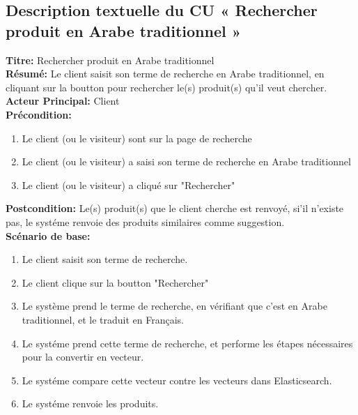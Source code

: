 \subsection{Description textuelle du CU « Rechercher produit en Arabe traditionnel »}
\noindent
\textbf{Titre:} Rechercher produit en Arabe traditionnel \\
\textbf{Résumé:} Le client saisit son terme de recherche en Arabe traditionnel, en cliquant sur la boutton pour rechercher le(s) produit(s) qu'il veut chercher. \\
\textbf{Acteur Principal:} Client \\
\textbf{Précondition:} \begin{enumerate}
	\item Le client (ou le visiteur) sont sur la page de recherche
	\item Le client (ou le visiteur) a saisi son terme de recherche en Arabe traditionnel
	\item Le client (ou le visiteur) a cliqué sur "Rechercher"
\end{enumerate}
\textbf{Postcondition:} Le(s) produit(s) que le client cherche est renvoyé, si'il n'existe pas, le systéme renvoie des produits similaires comme suggestion. \\
\textbf{Scénario de base: }
\begin{enumerate}
	\item Le client saisit son terme de recherche.
	\item Le client clique sur la boutton "Rechercher"
	\item Le système prend le terme de recherche, en vérifiant que c'est en Arabe traditionnel, et le traduit en Français.
	\item Le systéme prend cette terme de recherche, et performe les étapes nécessaires pour la convertir en vecteur.
	\item Le systéme compare cette vecteur contre les vecteurs dans Elasticsearch.
	\item Le systéme renvoie les produits.
\end{enumerate}

